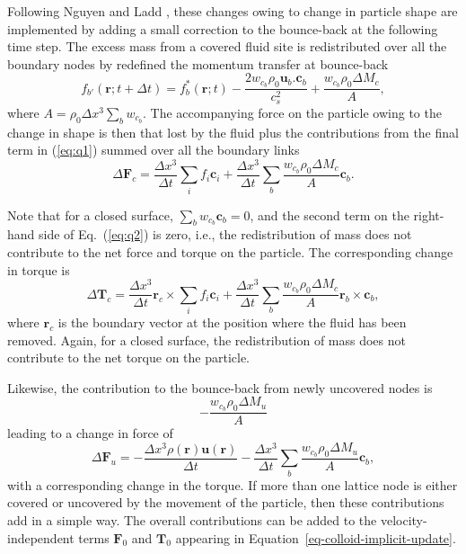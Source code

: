 Following Nguyen and Ladd \cite{nguyen-ladd2002}, these changes owing
to change in particle shape are implemented by adding a small
correction to the bounce-back at the following time step.
The excess mass from a covered fluid site is redistributed over all the
boundary nodes by redefined the momentum transfer at bounce-back
\begin{equation}
f_{b'}(\mathbf{r}; t + \Delta t) = f_b^\ast (\mathbf{r}; t)
- \frac{2 w_{c_b} \rho_0 \mathbf{u}_b . \mathbf{c}_b}{c_s^2}
+ \frac{w_{c_b} \rho_0\Delta M_c }{A},
\label{eq:q1}
\end{equation}
where $A = \rho_0 \Delta x^3 \sum_b w_{c_b}$. The accompanying
force on the particle owing to the change in shape is then
that lost by the fluid plus the contributions from the final term
in (\ref{eq:q1}) summed over all the boundary links
\begin{equation}
\Delta \mathbf{F}_c = \frac{\Delta x^3}{\Delta t}\sum_{i} f_i \mathbf{c}_i
+ \frac{\Delta x^3}{\Delta t} \sum_b \frac{w_{c_b} \rho_0 \Delta M_c}{A}
\mathbf{c}_b.
\label{eq:q2}
\end{equation}

Note that for a closed surface,
$\sum_b w_{c_b}\mathbf{c}_b = 0$, and the second term on the right-hand
side of Eq.~(\ref{eq:q2}) is zero, i.e., the redistribution of mass
does not contribute to the net force and torque on the particle.
The corresponding change in torque is
\begin{equation}
\Delta \mathbf{T}_c = \frac{\Delta x^3}{\Delta t} \mathbf{r}_c
\times \sum_i f_i \mathbf{c}_i
+ \frac{\Delta x^3}{\Delta t}
\sum_b \frac{w_{c_b}\rho_0 \Delta M_c}{A} \mathbf{r}_b \times \mathbf{c}_b,
\label{eq:q2a}
\end{equation}
where $\mathbf{r}_c$ is the boundary vector at the position where the
fluid has been removed. Again, for a closed surface, the
redistribution of mass does not contribute to the net torque
on the particle.

Likewise, the contribution to the bounce-back from newly uncovered nodes
is
\begin{equation}
- \frac{w_{c_b} \rho_0 \Delta M_u}{A}
\label{eq:q3}
\end{equation}
leading to a change in force of
\begin{equation}
\Delta \mathbf{F}_u = -\frac{\Delta x^3 \rho(\mathbf{r})
\mathbf{u}(\mathbf{r})}{\Delta t} - \frac{\Delta x^3}{\Delta t} \sum_b
\frac{w_{c_b} \rho_0 \Delta M_u}{A} \mathbf{c}_b,
\label{eq:q4}
\end{equation}
with a corresponding change in the torque.
If more than one lattice node is either covered or uncovered by
the movement of the particle, then these contributions add in a simple
way. The overall contributions can be added to the
velocity-independent terms $\mathbf{F}_0$ and $\mathbf{T}_0$ appearing in
Equation~\ref{eq-colloid-implicit-update}.



